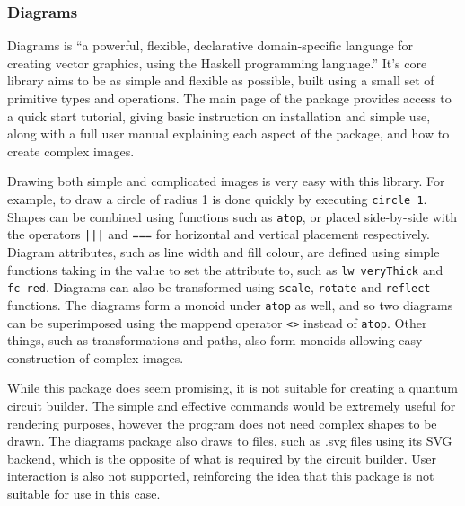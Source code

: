 \documentclass[a4paper,10pt, titlepage, twoside]{article}
\begin{document}
\subsubsection{Diagrams}
Diagrams \cite{diagrams} is ``a powerful, flexible, declarative domain-specific language for creating vector graphics, using the Haskell programming language.'' It's core library aims to be as simple and flexible as possible, built using a small set of primitive types and operations. The main page of the package \cite{diagrams} provides access to a quick start tutorial, giving basic instruction on installation and simple use, along with a full user manual explaining each aspect of the package, and how to create complex images. \par
Drawing both simple and complicated images is very easy with this library. For example, to draw a circle of radius 1 is done quickly by executing \texttt{circle 1}. Shapes can be combined using functions such as \texttt{atop}, or placed side-by-side with the operators \texttt{|||} and \texttt{===} for horizontal and vertical placement respectively. Diagram attributes, such as line width and fill colour, are defined using simple functions taking in the value to set the attribute to, such as \texttt{lw veryThick} and \texttt{fc red}. Diagrams can also be transformed using \texttt{scale}, \texttt{rotate} and \texttt{reflect} functions. The diagrams form a monoid under \texttt{atop} as well, and so two diagrams can be superimposed using the mappend operator \texttt{<>} instead of \texttt{atop}. Other things, such as transformations and paths, also form monoids allowing easy construction of complex images.\par
While this package does seem promising, it is not suitable for creating a quantum circuit builder. The simple and effective commands would be extremely useful for rendering purposes, however the program does not need complex shapes to be drawn. The diagrams package also draws to files, such as .svg files using its SVG backend, which is the opposite of what is required by the circuit builder. User interaction is also not supported, reinforcing the idea that this package is not suitable for use in this case. 
\end{document}
